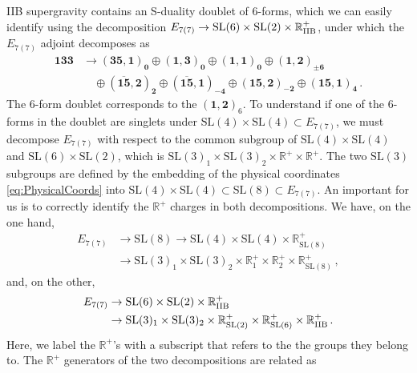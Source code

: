 \documentclass[a4paper, 11pt]{article}
\numberwithin{equation}{section}
\newcommand{\SL}[1]{\mathrm{SL}( #1 )}
\newcommand{\En}[1]{E_{#1(#1)}}
\newcommand{\+}{\oplus}
\begin{document}
IIB supergravity contains an S-duality doublet of 6-forms, which we can easily identify using the decomposition $\En{7} \rightarrow \SL{6} \times \SL{2} \times \mathbb{R}^+_{\rm IIB}$, under which the $\En{7}$ adjoint decomposes as
\begin{equation} \label{eq:AdjointSL6}
	\begin{split}
		\mathbf{133} &\rightarrow \mathbf{\left(35,1\right)_0} \oplus \mathbf{\left(1,3\right)_0} \oplus \mathbf{\left(1,1\right)_0} \oplus \mathbf{\left(1,2\right)_{\pm 6}} \\
		& \quad \oplus \mathbf{\left(\overline{15},2\right)_2} \oplus \mathbf{\left(\overline{15},1\right)_{-4}} \oplus \mathbf{\left(15,2\right)_{-2}} \oplus \mathbf{\left(15,1\right)_4} \,.
	\end{split}
\end{equation}
The 6-form doublet corresponds to the $\mathbf{\left(1,2\right)}_{6}$. To understand if one of the 6-forms in the doublet are singlets under $\SL{4} \times \SL{4} \subset \En{7}$, we must decompose $\En{7}$ with respect to the common subgroup of $\SL{4} \times \SL{4}$ and $\SL{6} \times \SL{2}$, which is $\SL{3}_1 \times \SL{3}_2 \times \mathbb{R}^+ \times \mathbb{R}^+$. The two $\SL{3}$ subgroups are defined by the embedding of the physical coordinates \eqref{eq:PhysicalCoords} into $\SL{4} \times \SL{4} \subset \SL{8} \subset \En{7}$. An important for us is to correctly identify the $\mathbb{R}^+$ charges in both decompositions. We have, on the one hand,
\begin{equation} \label{eq:SL4SL4}
	\begin{split}
		\En{7} &\rightarrow \SL{8} \rightarrow \SL{4} \times \SL{4} \times \mathbb{R}^+_{\SL{8}} \\
		&\rightarrow \SL{3}_1 \times \SL{3}_2 \times \mathbb{R}^+_1 \times \mathbb{R}^+_2 \times \mathbb{R}^+_{\SL{8}} \,,
	\end{split}
\end{equation}
and, on the other,
\begin{equation} \label{eq:SL6SL2}
	\begin{split}
		\En{7} &\rightarrow \SL{6} \times \SL{2} \times \mathbb{R}^+_{\rm IIB} \\
		&\rightarrow \SL{3}_1 \times \SL{3}_2 \times \mathbb{R}^+_{\SL{2}} \times \mathbb{R}^+_{\SL{6}} \times \mathbb{R}^+_{\rm IIB} \,.
	\end{split}
\end{equation}
Here, we label the $\mathbb{R}^+$'s with a subscript that refers to the the groups they belong to. The $\mathbb{R}^+$ generators of the two decompositions are related as
\end{document}
